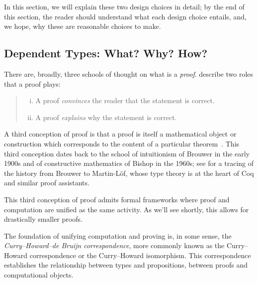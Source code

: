 In this section, we will explain these two design choices in detail;
by the end of this section, the reader should understand what each design choice entails, and, we hope, why these are reasonable choices to make.


\subsection{Dependent Types: What? Why? How?}\label{sec:why-how-dependent-types}
There are, broadly, three schools of thought on what is a \emph{proof}.
\textcite{Proof2009Geuvers} describe two roles that a proof plays:
\begin{quote}
\begin{enumerate}[(i)]
\item A proof \emph{convinces} the reader that the statement is correct.
\item A proof \emph{explains} why the statement is correct.
\end{enumerate}
\end{quote}
A third conception of proof is that a proof is itself a mathematical object or construction which corresponds to the content of a particular theorem~\cite{Rigour2013Bauer}.
This third conception dates back to the school of intuitionism of Brouwer in the early 1900s and of constructive mathematics of Bishop in the 1960s; see \textcite[Related Works]{nuprl} for a tracing of the history from Brouwer to Martin-L\"of, whose type theory is at the heart of Coq and similar proof assistants.


This third conception of proof admits formal frameworks where proof and computation are unified as the same activity.
As we'll see shortly, this allows for drastically smaller proofs.

The foundation of unifying computation and proving is, in some sense, the \emph{Curry--Howard--de Bruijn correspondence}, more commonly known as the Curry--Howard correspondence or the Curry--Howard isomorphism.
This correspondence establishes the relationship between types and propositions, between proofs and computational objects.

